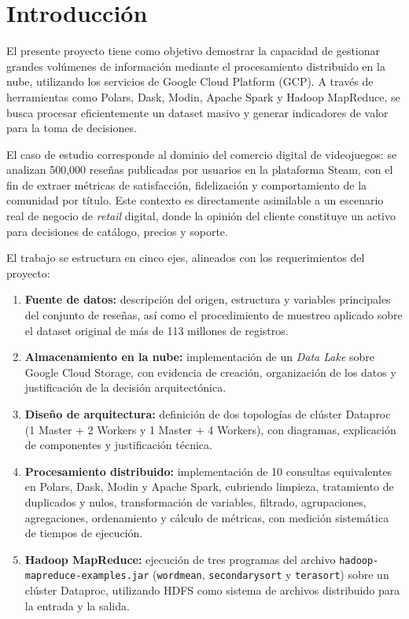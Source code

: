 \section{Introducción}

El presente proyecto tiene como objetivo demostrar la capacidad de gestionar grandes volúmenes de información mediante el procesamiento distribuido en la nube, utilizando los servicios de Google Cloud Platform (GCP). A través de herramientas como Polars, Dask, Modin, Apache Spark y Hadoop MapReduce, se busca procesar eficientemente un dataset masivo y generar indicadores de valor para la toma de decisiones.

El caso de estudio corresponde al dominio del comercio digital de videojuegos: se analizan 500,000 reseñas publicadas por usuarios en la plataforma Steam, con el fin de extraer métricas de satisfacción, fidelización y comportamiento de la comunidad por título. Este contexto es directamente asimilable a un escenario real de negocio de \textit{retail} digital, donde la opinión del cliente constituye un activo para decisiones de catálogo, precios y soporte.

El trabajo se estructura en cinco ejes, alineados con los requerimientos del proyecto:

\begin{enumerate}[leftmargin=*]
    \item \textbf{Fuente de datos:} descripción del origen, estructura y variables principales del conjunto de reseñas, así como el procedimiento de muestreo aplicado sobre el dataset original de más de 113 millones de registros.
    \item \textbf{Almacenamiento en la nube:} implementación de un \textit{Data Lake} sobre Google Cloud Storage, con evidencia de creación, organización de los datos y justificación de la decisión arquitectónica.
    \item \textbf{Diseño de arquitectura:} definición de dos topologías de clúster Dataproc (1 Master + 2 Workers y 1 Master + 4 Workers), con diagramas, explicación de componentes y justificación técnica.
    \item \textbf{Procesamiento distribuido:} implementación de 10 consultas equivalentes en Polars, Dask, Modin y Apache Spark, cubriendo limpieza, tratamiento de duplicados y nulos, transformación de variables, filtrado, agrupaciones, agregaciones, ordenamiento y cálculo de métricas, con medición sistemática de tiempos de ejecución.
    \item \textbf{Hadoop MapReduce:} ejecución de tres programas del archivo \texttt{hadoop-\bk{}mapreduce-\bk{}examples.\bk{}jar} (\texttt{wordmean}, \texttt{secondarysort} y \texttt{terasort}) sobre un clúster Dataproc, utilizando HDFS como sistema de archivos distribuido para la entrada y la salida.
\end{enumerate}

